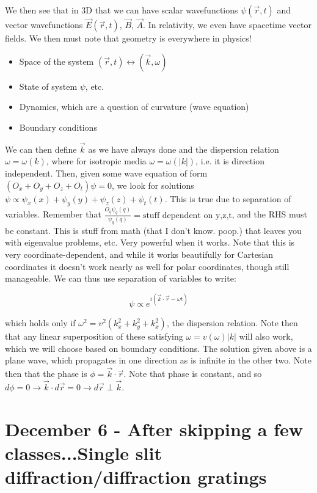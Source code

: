 \documentclass{report}
\begin{document}
We then see that in 3D that we can have scalar wavefunctions $\psi(\vec{r}, t)$ and vector wavefunctions $\vec{E}(\vec{r},t)$, $\vec{B}$, $\vec{A}$. In relativity, we even have spacetime vector fields. We then must note that geometry is everywhere in physics!

\begin{itemize}
\item Space of the system $(\vec{r},t) \leftrightarrow (\vec{k},\omega)$
\item State of system $\psi$, etc.
\item Dynamics, which are a question of curvature (wave equation)
\item Boundary conditions
\end{itemize}

We can then define $\vec{k}$ as we have always done and the dispersion relation $\omega = \omega(k)$, where for isotropic media $\omega = \omega(|k|)$, i.e. it is direction independent. Then, given some wave equation of form $(O_x + O_y + O_z + O_t)\psi = 0$, we look for solutions $\psi \propto \psi_x(x) + \psi_y(y) + \psi_z(z) + \psi_t(t)$. This is true due to separation of variables. Remember that $\frac{O_q\psi_q(q)}{\psi_q(q)} = \textrm{stuff dependent on y,z,t}$, and the RHS must be constant. This is stuff from math (that I don't know. poop.) that leaves you with eigenvalue problems, etc. Very powerful when it works. Note that this is very coordinate-dependent, and while it works beautifully for Cartesian coordinates it doesn't work nearly as well for polar coordinates, though still manageable. We can thus use separation of variables to write:

$$\psi \propto e^{i(\vec{k}\cdot\vec{r} - \omega t)}$$

which holds only if $\omega^2 = v^2(k_x^2 + k_y^2 + k_x^2)$, the dispersion relation. Note then that any linear superposition of these satisfying $\omega = v(\omega)|k|$ will also work, which we will choose based on boundary conditions. The solution given above is a plane wave, which propagates in one direction as is infinite in the other two. Note then that the phase is $\phi = \vec{k}\cdot\vec{r}$. Note that phase is constant, and so $d\phi = 0 \rightarrow \vec{k}\cdot d\vec{r} = 0 \rightarrow d\vec{r}\perp \vec{k}$. 

\chapter{December 6 - After skipping a few classes...Single slit diffraction/diffraction gratings}
\end{document}
